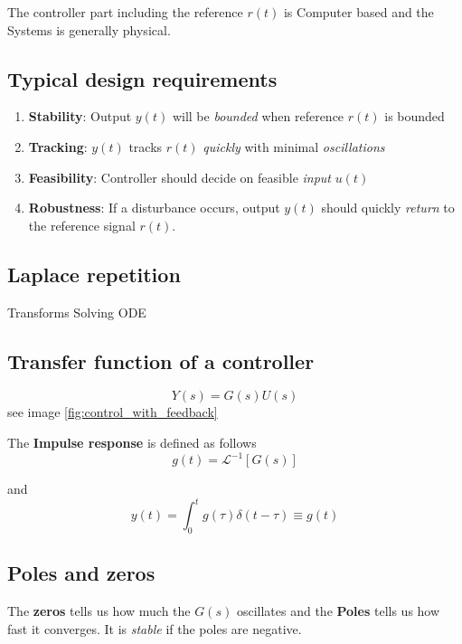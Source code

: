 The controller part including the reference $r(t)$ is Computer based and the Systems
is generally physical.

\subsection{Typical design requirements}
\begin{enumerate}
    \item \textbf{Stability}: Output $y(t)$ will be \textit{bounded} when reference $r(t)$ is bounded
    \item \textbf{Tracking}: $y(t)$ tracks $r(t)$ \textit{quickly} with minimal \textit{oscillations}
    \item \textbf{Feasibility}: Controller should decide on feasible \textit{input} $u(t)$
    \item \textbf{Robustness}: If a disturbance occurs, output $y(t)$ should quickly \textit{return} to the reference signal $r(t)$.
\end{enumerate}

\subsection{Laplace repetition}
Transforms
Solving ODE 

\subsection{Transfer function of a controller}
\begin{equation*}
    Y(s) = G(s) U(s)
\end{equation*}
see image \ref{fig:control_with_feedback}

The \textbf{Impulse response} is defined as follows
\begin{equation*}
    g(t) = \mathcal{L}^{-1}[G(s)]
\end{equation*}

and
\begin{equation*}
    y(t) = \int_0^t g(\tau) \delta(t-\tau) \equiv g(t)
\end{equation*}

\subsection{Poles and zeros}
The \textbf{zeros} tells us how much the $G(s)$ oscillates and the \textbf{Poles} tells
us how fast it converges. It is \textit{stable} if the poles are negative.

